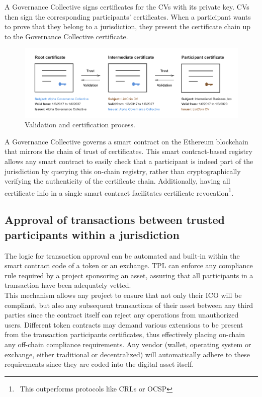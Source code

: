 \documentclass[10pt]{article}
\begin{document}
\noindent A Governance Collective signs certificates for the CVs with its private key. CVs then sign the corresponding participants' certificates. When a participant wants to prove that they belong to a jurisdiction, they present the certificate chain up to the Governance Collective certificate.\\

\begin{figure}[ht]
    \centering
    \includegraphics[width=0.8\linewidth]{figures/figure3.png}
    \caption{Validation and certification process.}
    \label{fig:fig3}
\end{figure}

\noindent A Governance Collective governs a smart contract on the Ethereum\cite{ethereum} blockchain that mirrors the chain of trust of certificates. This smart contract-based registry allows any smart contract to easily check that a participant is indeed part of the jurisdiction by querying this on-chain registry, rather than cryptographically verifying the authenticity of the certificate chain. Additionally, having all certificate info in a single smart contract facilitates certificate revocation\footnote{\ This outperforms protocols like CRLs or OCSP}.\\

\subsection{Approval of transactions between trusted participants within a jurisdiction}
The logic for transaction approval can be automated and built-in within the smart contract code of a token or an exchange. TPL can enforce any compliance rule required by a project sponsoring an asset, assuring that all participants in a transaction have been adequately vetted.\\

\noindent This mechanism allows any project to ensure that not only their ICO will be compliant, but also any subsequent transactions of their asset between any third parties since the contract itself can reject any operations from unauthorized users. Different token contracts may demand various extensions to be present from the transaction participants certificates, thus effectively placing on-chain any off-chain compliance requirements. Any vendor (wallet, operating system or exchange, either traditional or decentralized) will automatically adhere to these requirements since they are coded into the digital asset itself.\\
\end{document}
